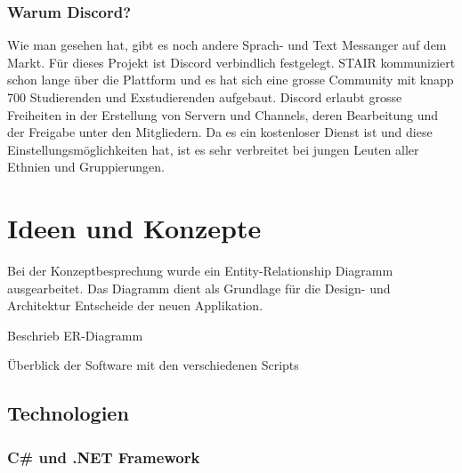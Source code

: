 \documentclass[a4paper, table]{article}
\begin{document}
\subsubsection*{Warum Discord?}
Wie man gesehen hat, gibt es noch andere Sprach- und Text Messanger auf dem Markt.
Für dieses Projekt ist Discord verbindlich festgelegt.
STAIR kommuniziert schon lange über die Plattform und es hat sich eine grosse Community mit knapp 700 Studierenden und Exstudierenden aufgebaut.
Discord erlaubt grosse Freiheiten in der Erstellung von Servern und Channels, deren Bearbeitung und der Freigabe unter den Mitgliedern.
Da es ein kostenloser Dienst ist und diese Einstellungsmöglichkeiten hat, ist es sehr verbreitet bei jungen Leuten aller Ethnien und Gruppierungen.

\newpage
\section{Ideen und Konzepte}

Bei der Konzeptbesprechung wurde ein Entity-Relationship Diagramm ausgearbeitet. Das Diagramm dient als Grundlage für die Design-
und Architektur Entscheide der neuen Applikation.

Beschrieb ER-Diagramm


Überblick der Software mit den verschiedenen Scripts

\subsection{Technologien}

\subsubsection{C\# und .NET Framework}
\end{document}
